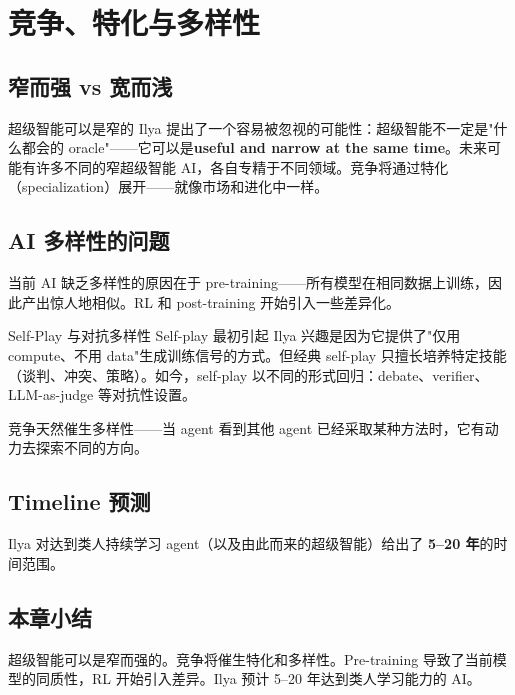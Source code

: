 \section{竞争、特化与多样性}

\subsection{窄而强 vs 宽而浅}

\begin{importantbox}{超级智能可以是窄的}
Ilya 提出了一个容易被忽视的可能性：超级智能不一定是"什么都会的 oracle"——它可以是\textbf{useful and narrow at the same time}。未来可能有许多不同的窄超级智能 AI，各自专精于不同领域。竞争将通过特化（specialization）展开——就像市场和进化中一样。
\end{importantbox}

\subsection{AI 多样性的问题}

当前 AI 缺乏多样性的原因在于 pre-training——所有模型在相同数据上训练，因此产出惊人地相似。RL 和 post-training 开始引入一些差异化。

\begin{knowledgebox}{Self-Play 与对抗多样性}
Self-play 最初引起 Ilya 兴趣是因为它提供了"仅用 compute、不用 data"生成训练信号的方式。但经典 self-play 只擅长培养特定技能（谈判、冲突、策略）。如今，self-play 以不同的形式回归：debate、verifier、LLM-as-judge 等对抗性设置。

竞争天然催生多样性——当 agent 看到其他 agent 已经采取某种方法时，它有动力去探索不同的方向。
\end{knowledgebox}

\subsection{Timeline 预测}

Ilya 对达到类人持续学习 agent（以及由此而来的超级智能）给出了 \textbf{5--20 年}的时间范围。

\subsection{本章小结}

超级智能可以是窄而强的。竞争将催生特化和多样性。Pre-training 导致了当前模型的同质性，RL 开始引入差异。Ilya 预计 5--20 年达到类人学习能力的 AI。


